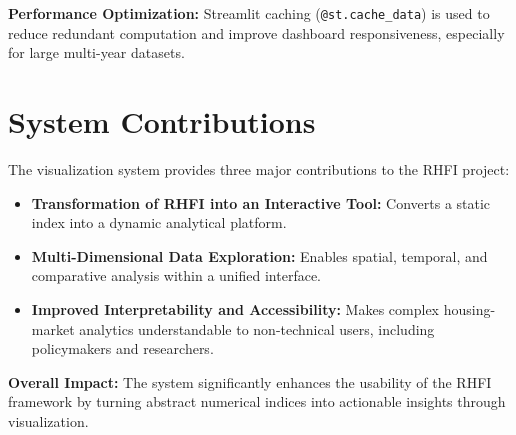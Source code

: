 \documentclass[11pt,twocolumn]{article}
\begin{document}
    \textbf{Performance Optimization:}
    Streamlit caching (\texttt{@st.cache\_data}) is used to reduce redundant computation and improve dashboard responsiveness, especially for large multi-year datasets.

    \section{System Contributions}

    The visualization system provides three major contributions to the RHFI project:

    \begin{itemize}[leftmargin=1.2em]
        \item \textbf{Transformation of RHFI into an Interactive Tool:} Converts a static index into a dynamic analytical platform.

        \item \textbf{Multi-Dimensional Data Exploration:} Enables spatial, temporal, and comparative analysis within a unified interface.

        \item \textbf{Improved Interpretability and Accessibility:} Makes complex housing-market analytics understandable to non-technical users, including policymakers and researchers.
    \end{itemize}

    \textbf{Overall Impact:}
    The system significantly enhances the usability of the RHFI framework by turning abstract numerical indices into actionable insights through visualization.

\end{document}

